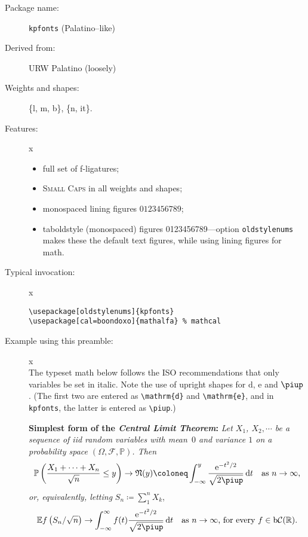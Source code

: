 \documentclass{article}
\def\Pr{\ensuremath{\mathbb{P}}}
\def\d{\mathrm{d}}
\begin{document}
\thispagestyle{empty}
\begin{description}
\item[Package name:] {\tt kpfonts} (Palatino--like)
\item[Derived from:] URW Palatino (loosely)
\item[Weights and shapes:]  \{l, m, b\}, \{n, it\}. 
\item[Features:]{\color{white}x}\\[-15pt]  
\begin{itemize}
\item
full set of f-ligatures;
\item \textsc{Small Caps} in all weights and shapes;
\item monospaced lining figures $0123456789$;
\item taboldstyle (monospaced) figures 0123456789---option {\tt oldstylenums} makes these the default text figures, while using lining figures for math.
\end{itemize}
\item[Typical invocation:]{\color{white}x}
\begin{verbatim}
\usepackage[oldstylenums]{kpfonts} 
\usepackage[cal=boondoxo]{mathalfa} % mathcal
\end{verbatim}
\item[Example using this preamble:]{\color{white}x}\\[6pt]
\lipsum[1]
\def\Pr{\ensuremath{\mathbb{P}}}
\def\d{\mathrm{d}}
The typeset math below follows the ISO recommendations that only variables
be set in italic. Note the use of upright shapes for $\d$, $\mathrm{e}$
and $\piup$. (The first two are entered as \verb|\mathrm{d}| and
\verb|\mathrm{e}|, and in {\tt kpfonts},
 the latter is entered as \verb|\piup|.)

\textbf{Simplest form of the \textit{Central Limit Theorem}:} \textit{Let
$X_1$, $X_2,\cdots$ be a sequence of iid random variables with mean~$0$ 
and variance $1$ on a probability space $(\Omega,\mathcal{F},\Pr)$. Then}
\[\Pr\left(\frac{X_1+\cdots+X_n}{\sqrt{n}}\le y\right)\to\mathfrak{N}(y)\coloneq
\int_{-\infty}^y \frac{\mathrm{e}^{-t^2/2}}{\sqrt{2\piup}}\,
\mathrm{d}t\quad\mbox{as $n\to\infty$,}\]
\textit{or, equivalently, letting} $S_n\coloneq\sum_1^n X_k$,
\[\mathbb{E} f\left(S_n/\sqrt{n}\right)\to \int_{-\infty}^\infty f(t)
\frac{\mathrm{e}^{-t^2/2}}{\sqrt{2\piup}}\,\mathrm{d}t
\quad\mbox{as $n\to\infty$, for every $f\in\mathrm{b}
\mathcal{C}(\mathbb{R})$.}\]
\end{description}
\end{document}
